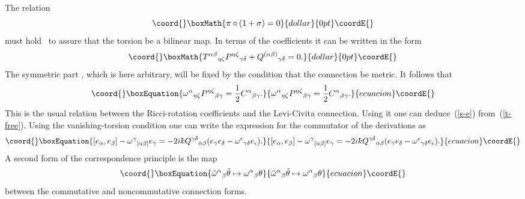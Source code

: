 \documentclass[12pt,a4paper]{article}
\newcounter{eg}
\def\t#1{\tilde #1}
\def\kbar{{\mathchar'26\mkern-9muk}}
\def\cn#1{\cite{#1}}
\begin{document}
The relation
$$\coord{}\boxMath{
\pi \circ (1 + \sigma) = 0
}{dollar}{0pt}\coordE{}$$
must hold~\cn{DimMad96,MadMou98} to assure that the torsion be a
bilinear map. In terms of the coefficients
\coordHE{} it can be written in the form
$$\coord{}\boxMath{
T^{\alpha\beta}{}_{\eta\zeta} P^{\eta\zeta}{}_{\gamma\delta} +  
Q^{(\alpha\beta)}{}_{\gamma\delta} = 0.  
}{dollar}{0pt}\coordE{}$$
The symmetric part \coordHE{}, which is here 
arbitrary, will be fixed by the condition that the connection be metric.
It follows that
\begin{equation}\coord{}\boxEquation{
\omega^\alpha{}_{\eta\zeta}P^{\eta\zeta}{}_{\beta\gamma} =
\frac 12 C^\alpha{}_{\beta\gamma}.                     \label{T0}
}{
\omega^\alpha{}_{\eta\zeta}P^{\eta\zeta}{}_{\beta\gamma} =
\frac 12 C^\alpha{}_{\beta\gamma}.                     }{ecuacion}\coordE{}\end{equation}
This is the usual relation between the Ricci-rotation coefficients
and the Levi-Civita connection. Using it one can deduce~(\ref{s-e})
from~(\ref{t-free}).  Using the vanishing-torsion condition one can
write the expression for the commutator of the derivations as
\begin{equation}\coord{}\boxEquation{
[e_\alpha, e_\beta] - \omega^\gamma{}_{[\alpha\beta]} e_\gamma = 
- 2i\kbar Q^{\gamma\delta}{}_{\alpha\beta} 
(e_{\gamma} e_{\delta} - \omega^\epsilon{}_{\gamma\delta} e_\epsilon).
                                                         \label{consis3}
}{
[e_\alpha, e_\beta] - \omega^\gamma{}_{[\alpha\beta]} e_\gamma = 
- 2i\kbar Q^{\gamma\delta}{}_{\alpha\beta} 
(e_{\gamma} e_{\delta} - \omega^\epsilon{}_{\gamma\delta} e_\epsilon).
                                                         }{ecuacion}\coordE{}\end{equation}
A second form of the correspondence principle is the map
\begin{equation}\coord{}\boxEquation{
\t{\omega}^\alpha{}_{\beta} \t{\theta} \mapsto 
\omega^\alpha{}_{\beta} \theta                             \label{cp2}
}{
\t{\omega}^\alpha{}_{\beta} \t{\theta} \mapsto 
\omega^\alpha{}_{\beta} \theta                             }{ecuacion}\coordE{}\end{equation}
between the commutative and noncommutative connection forms.
\end{document}
